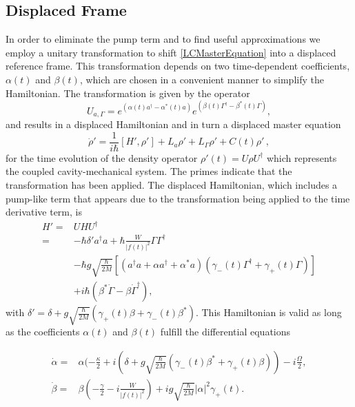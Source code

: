 \documentclass[reprint, amsmath,amssymb, aps,pra]{revtex4-1}
\begin{document}
\subsection{Displaced Frame}

In order to eliminate the pump term and to find useful approximations
we employ a unitary transformation to shift \eqref{LCMasterEquation}
into a displaced reference frame. This transformation depends on two
time-dependent coefficients, $\alpha(t)$ and $\beta(t)$, which are
chosen in a convenient manner to simplify the Hamiltonian. The
transformation is given by the operator
\begin{equation}\label{ShiftTransform}
U_{a,\Gamma} = e^{(\alpha(t) a^\dagger - \alpha^*(t)a)}e^{(\beta(t) \Gamma^\dagger - \beta^*(t)\Gamma)},
\end{equation}
and results in a displaced Hamiltonian and in turn a displaced master
equation
\begin{equation}\label{eq:master_no_small}
\dot{\rho}' = \frac{1}{i\hbar}[H',\rho'] +L_a\rho' + L_\Gamma \rho' + C(t)\rho'\, ,
\end{equation}
for the time evolution of the density operator
$\rho'(t)=U\rho U^\dagger$ which represents the coupled
cavity-mechanical system. The primes indicate that the
transformation has been applied. The displaced Hamiltonian, which
includes a pump-like term that appears due to the transformation being applied to the time derivative term, is
\begin{align}\label{eq:hamiltonian_no_small}
  H'=&U H U^\dagger\nonumber\\=& -\hbar \delta' a^\dagger a + \hbar\frac{W}{|f(t)|^2}\Gamma \Gamma^\dagger\nonumber\\
     &-\hbar g\sqrt{\frac{\hbar}{2M}}[(a^{\dagger}a +\alpha a^{\dagger}+\alpha^* a)(\gamma_-(t)\Gamma^{\dagger}+\gamma_+(t)\Gamma)]\nonumber\\
     &+ i\hbar(\beta^*\dot{\Gamma} - \beta \dot{\Gamma}^\dagger),
\end{align}
with $\delta' = \delta + g\sqrt{\frac{\hbar}{2M}}(\gamma_+(t)\beta + \gamma_-(t)\beta^*)$.
This Hamiltonian is valid as long as the coefficients $\alpha(t)$ and
$\beta(t)$ fulfill the differential equations

\begin{align}\label{eq:displaced_frame}
\dot{\alpha} =& \alpha(-\frac{\kappa}{2}+i(\delta+g\sqrt{\frac{\hbar}{2M}}(\gamma_-(t) \beta^* + \gamma_+(t) \beta))-i\frac{\Omega}{2},\\
\dot{\beta} =& \beta(-\frac{\gamma}{2}-i\frac{W}{|f(t)|^2})+ig\sqrt{\frac{\hbar}{2M}}|\alpha|^2\gamma_+(t).
\end{align}
\end{document}
